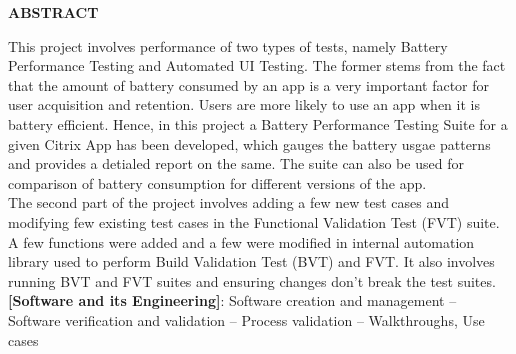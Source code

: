 \setlength\parindent{0pt}
\begin{center}
\large{\textbf{ABSTRACT}}\\
\vspace{1cm}
\end{center}
This project involves performance of two types of tests, namely Battery Performance Testing and Automated UI Testing. The former stems from the fact that the amount of battery consumed by an app is a very important factor for user acquisition and retention. Users are more likely to use an app when it is battery efficient. Hence, in this project a Battery Performance Testing Suite for a given Citrix App has been developed, which gauges the battery usgae patterns and provides a detialed report on the same. The suite can also be used for comparison of battery consumption for different versions of the app.\\

The second part of the project involves adding a few new test cases and modifying few existing test cases in the Functional Validation Test (FVT) suite. A few functions were added and a few were modified in internal automation library used to perform Build Validation Test (BVT) and FVT. It also involves running BVT and FVT suites and ensuring changes don't break the test suites.\\

\textbf{[Software and its Engineering]}:   Software creation and management -- Software verification and validation --  Process validation -- Walkthroughs, Use cases